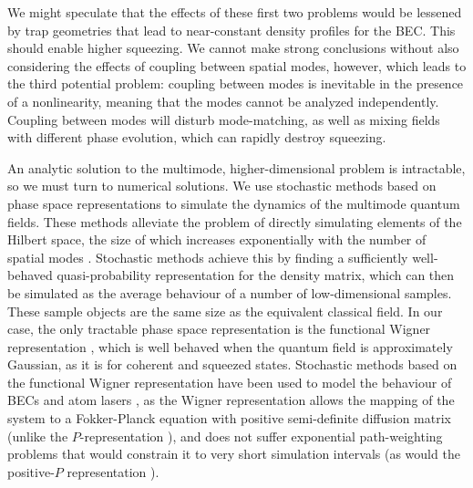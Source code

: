 \documentclass{iopart}
\begin{document}
We might speculate that the effects of these first two problems would be lessened by trap geometries that lead to near-constant density profiles for the BEC.  This should enable higher squeezing.  We cannot make strong conclusions without also considering the effects of coupling between spatial modes, however, which leads to the third potential problem: coupling between modes is inevitable in the presence of a nonlinearity, meaning that the modes cannot be analyzed independently. Coupling between modes will disturb mode-matching, as well as mixing fields with different phase evolution, which can rapidly destroy squeezing.  

An analytic solution to the multimode, higher-dimensional problem is intractable, so we must turn to numerical solutions.  We use stochastic methods based on phase space representations to simulate the dynamics of the multimode quantum fields.  These methods alleviate the problem of directly simulating elements of the Hilbert space, the size of which increases exponentially with the number of spatial modes \cite{gardiner1991, steelET1998}.  Stochastic methods achieve this by finding a sufficiently well-behaved quasi-probability representation for the density matrix, which can then be simulated as the average behaviour of a number of low-dimensional samples.  These sample objects are the same size as the equivalent classical field.  In our case, the only tractable phase space representation is the functional Wigner representation \cite{steelET1998}, which is well behaved when the quantum field is approximately Gaussian, as it is for coherent and squeezed states.  Stochastic methods based on the functional Wigner representation have been used to model the behaviour of BECs and atom lasers \cite{johnssonET2007,dallET2009,dennisET2010}, as the Wigner representation allows the mapping of the system to a Fokker-Planck equation with positive semi-definite diffusion matrix (unlike the $P$-representation \cite{gardiner1991}), and does not suffer exponential path-weighting problems that would constrain it to very short simulation intervals (as would the positive-$P$ representation \cite{gardiner1991}).
\end{document}

